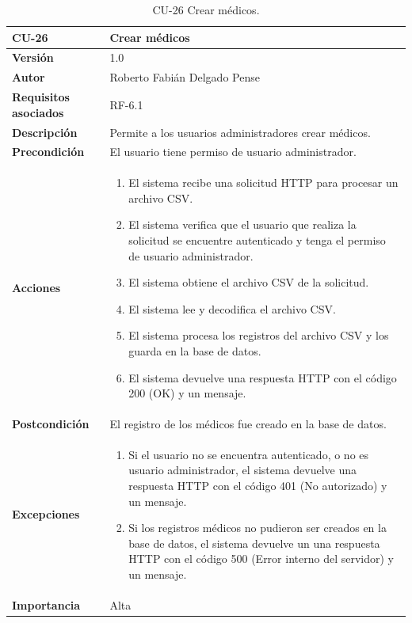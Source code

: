 \begin{table}[p]
	\centering
	\begin{tabularx}{\linewidth}{ p{} p{} }
		\toprule
		\textbf{CU-26}    & \textbf{Crear médicos}\\
		\toprule
		\textbf{Versión}              & 1.0    \\
		\textbf{Autor}                & Roberto Fabián Delgado Pense \\
		\textbf{Requisitos asociados} & RF-6.1 \\ 
		\textbf{Descripción}          & Permite a los usuarios administradores crear médicos. \\
		\textbf{Precondición}         & El usuario tiene permiso de usuario administrador. \\  
		\textbf{Acciones}             &
		\begin{enumerate}
			\def\labelenumi{\arabic{enumi}.}
			\tightlist
			\item El sistema recibe una solicitud HTTP para procesar un archivo CSV.
                \item El sistema verifica que el usuario que realiza la solicitud se encuentre autenticado y tenga el permiso de usuario administrador.
                \item El sistema obtiene el archivo CSV de la solicitud.
                \item El sistema lee y decodifica el archivo CSV.
                \item El sistema procesa los registros del archivo CSV y los guarda en la base de datos.
                \item El sistema devuelve una respuesta HTTP con el código 200 (OK) y un mensaje.         
            \end{enumerate}\\
		\textbf{Postcondición}        & El registro de los médicos fue creado en la base de datos. \\
		\textbf{Excepciones}          & 
              \begin{enumerate}
			\def\labelenumi{\arabic{enumi}.}
			\tightlist
   			\item Si el usuario no se encuentra autenticado, o no es usuario administrador, el sistema devuelve una                 respuesta HTTP con el código 401 (No autorizado) y un mensaje.
                \item   Si los registros médicos no pudieron ser creados en la base de datos, el sistema devuelve un        una respuesta HTTP con el código 500 (Error interno del servidor) y un mensaje. 
            \end{enumerate}\\
		\textbf{Importancia}          & Alta \\
		\bottomrule
	\end{tabularx}
	\caption{CU-26 Crear médicos.}
\end{table}


